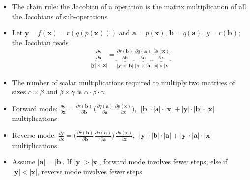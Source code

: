 \documentclass[10pt]{extarticle}
\newcommand{\ds}{\displaystyle}
\theoremstyle{definition}
\newcommand{\va}{\mathbf{a}}
\newcommand{\vb}{\mathbf{b}}
\newcommand{\vx}{\mathbf{x}}
\newcommand{\vy}{\mathbf{y}}
\begin{document}
\begin{itemize}\setlength\itemsep{0em}
  \item The chain rule: the Jacobian of a operation is the matrix multiplication of all the Jacobians of sub-operations
  \item Let $\ds\vy = f(\vx) = r(q(p(\vx)))$ and $\va = p(\vx)$, $\vb = q(\va)$, $y = r(\vb)$; the Jacobian reads
    \begin{align*}
      \underbrace{\frac{\partial\vy}{\partial\vx}}_{|\vy|\times|\vx|} = \underbrace{\frac{\partial r(\vb)}{\partial\vb}}_{|\vy|\times|\vb|}\,\underbrace{\frac{\partial q(\va)}{\partial\va}}_{|\vb|\times|\va|}\,\underbrace{\frac{\partial p(\vx)}{\partial\vx}}_{|\va|\times|\vx|}
    \end{align*}
  \item The number of scalar multiplications required to multiply two matrices of sizes $\alpha\times\beta$ and $\beta\times\gamma$ is $\alpha\cdot\beta\cdot\gamma$
  \item Forward mode: $\ds\frac{\partial\vy}{\partial\vx} = \frac{\partial r(\vb)}{\partial\vb}\,\Big(\frac{\partial q(\va)}{\partial\va}\,\frac{\partial p(\vx)}{\partial\vx}\Big)$, $\;\ds|\vb|\cdot|\va|\cdot|\vx| + |\vy|\cdot|\vb|\cdot|\vx|$ multiplications
  \item Reverse mode: $\ds\frac{\partial\vy}{\partial\vx} = \Big(\frac{\partial r(\vb)}{\partial\vb}\,\frac{\partial q(\va)}{\partial\va}\Big)\,\frac{\partial p(\vx)}{\partial\vx}$, $\;\ds|\vy|\cdot|\vb|\cdot|\va| + |\vy|\cdot|\va|\cdot|\vx|$ multiplications
  \item Assume $|\va| = |\vb|$. If $|\vy| > |\vx|$, forward mode involves fewer steps; else if $|\vy| < |\vx|$, reverse mode involves fewer steps
\end{itemize}

\newpage



\end{document}
